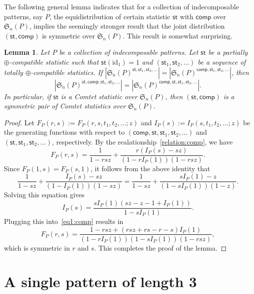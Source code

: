 \documentclass[12pt]{amsart}
\numberwithin{equation}{section}
\theoremstyle{plain}
\newtheorem{lemma}[theorem]{Lemma}
\theoremstyle{definition}
\def\S{\mathfrak{S}}
\def\comp{\mathsf{comp}}
\def\st{\mathsf{st}}
\def\id{\mathrm{id}}
\begin{document}
The following general lemma indicates that for a collection of indecomposable patterns, say $P$, the equidistribution of certain statistic $\st$ with $\comp$ over $\S_n(P)$, implies the seemingly stronger result that the joint distribution $(\st, \comp)$ is symmetric over $\S_n(P)$. This result is somewhat surprising. 
\begin{lemma}\label{general:sym}
Let $P$ be a collection of indecomposable patterns. Let $\st$ be a partially  $\oplus$-compatible statistic such that $\st(\id_1)=1$ and  $(\st_1,\st_2,\ldots)$ be a sequence of totally  $\oplus$-compatible statistics. If $|\S_n(P)^{\st,\st_1,\st_2,\ldots}|=|\S_n(P)^{\comp,\st_1,\st_2,\ldots}|$, then 
$$
|\S_n(P)^{\st,\comp,\st_1,\st_2,\ldots}|=|\S_n(P)^{\comp,\st,\st_1,\st_2,\ldots}|.
$$
In particular, if $\st$ is a Comtet statistic over $\S_n(P)$, then $(\st,\comp)$ is a symmetric pair of Comtet statistics over $\S_n(P)$. 
\end{lemma}
\begin{proof}
Let $F_P(r,s):=F_P(r,s,t_1,t_2,\ldots;z)$  and $I_P(s):=I_P(s,t_1,t_2,\ldots;z)$ be the generating functions with respect to $(\comp,\st,\st_1,\st_2,\ldots)$ and $(\st,\st_1,\st_2,\ldots)$, respectively.  By the realationship~\eqref{relation:comp}, we have 
\begin{equation}\label{eq1:comp}
F_P(r,s)=\frac{1}{1-rsz}+\frac{r(I_P(s)-sz)}{(1-rI_P(1))(1-rsz)}.
\end{equation}
Since $F_P(1,s)=F_P(s,1)$, it follows from the above identity that 
$$
\frac{1}{1-sz}+\frac{I_P(s)-sz}{(1-I_P(1))(1-sz)}=\frac{1}{1-sz}+\frac{sI_P(1)-z}{(1-sI_P(1))(1-z)}.
$$
Solving this equation gives 
$$
I_P(s)=\frac{sI_P(1)(sz-z-1+I_P(1))}{1-sI_P(1)}.
$$
Plugging this into~\eqref{eq1:comp} results in 
\begin{equation}\label{gen:symm}
F_P(r,s)=\frac{1-rsz+(rsz+rs-r-s)I_P(1)}{(1-rI_P(1))(1-sI_P(1))(1-rsz)},
\end{equation}
which is symmetric in $r$ and $s$. This completes the proof of the lemma.
\end{proof}






 


\section{A single pattern of length 3}\label{sec:one 3-pattern}
\end{document}
